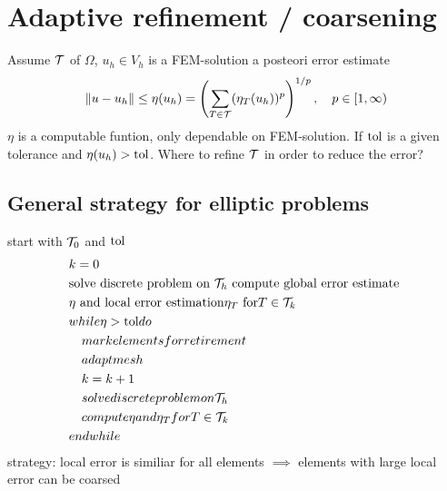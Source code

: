\section{Adaptive refinement / coarsening}
Assume $\mathcal{T}$ of $\Omega$, $u_h\in V_h$ is a FEM-solution \nl
a posteori error estimate 
\begin{equation*}
	\|u-u_h\| \leq \eta(u_h) = \left( \displaystyle \sum_{T\in \mathcal{T}} (\eta_T(u_h))^p\right)^{1/p}, \quad p\in [1,\infty)
\end{equation*}
$\eta$ is a computable funtion, only dependable on FEM-solution. If $\text{tol}$ is a given tolerance and $\eta(u_h) > \text{tol}$. Where to refine $\mathcal{T}$ in order to reduce the error?
\subsection{General strategy for elliptic problems}
start with $\mathcal{T}_0$ and $\text{tol}$
\begin{align*}
	{}&k=0\\
	{}&\text{solve discrete problem on }\mathcal{T}_h \text{ compute global error estimate }\\
	{}& \eta \text{ and local error estimation} \eta_T \text{ for} T\in \mathcal{T}_k\\
	{}&while \eta > \text{tol} do\\
	{}& \quad mark elements for retirement\\
	{}& \quad adapt mesh\\
	{}& \quad k=k+1\\
	{}& \quad solve discrete problem on \mathcal{T}_h\\
	{}& \quad compute \eta and \eta_T for T\in \mathcal{T}_k\\
	{}&end while	 
\end{align*}
strategy: local error is similiar for all elements $\implies$ elements with large local error can be coarsed
